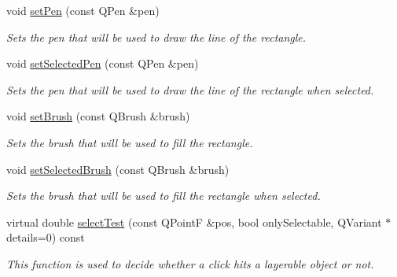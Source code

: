 \begin{DoxyCompactItemize}
\item 
void \hyperlink{classQCPItemRect_a483c0da5a17e1646cd17ddea2c124e7d}{set\+Pen} (const Q\+Pen \&pen)
\begin{DoxyCompactList}\small\item\em Sets the pen that will be used to draw the line of the rectangle. \end{DoxyCompactList}\item 
void \hyperlink{classQCPItemRect_a52a1bcb2dc753a538e406a2ba3cf21ce}{set\+Selected\+Pen} (const Q\+Pen \&pen)
\begin{DoxyCompactList}\small\item\em Sets the pen that will be used to draw the line of the rectangle when selected. \end{DoxyCompactList}\item 
void \hyperlink{classQCPItemRect_abbd4e346a03513ee466afc25d9c75446}{set\+Brush} (const Q\+Brush \&brush)
\begin{DoxyCompactList}\small\item\em Sets the brush that will be used to fill the rectangle. \end{DoxyCompactList}\item 
void \hyperlink{classQCPItemRect_abd1792859844118dedee86223cede7af}{set\+Selected\+Brush} (const Q\+Brush \&brush)
\begin{DoxyCompactList}\small\item\em Sets the brush that will be used to fill the rectangle when selected. \end{DoxyCompactList}\item 
virtual double \hyperlink{classQCPItemRect_af13b0797079b40b73d1c7286b76f18ac}{select\+Test} (const Q\+Point\+F \&pos, bool only\+Selectable, Q\+Variant $\ast$details=0) const 
\begin{DoxyCompactList}\small\item\em This function is used to decide whether a click hits a layerable object or not. \end{DoxyCompactList}\end{DoxyCompactItemize}
